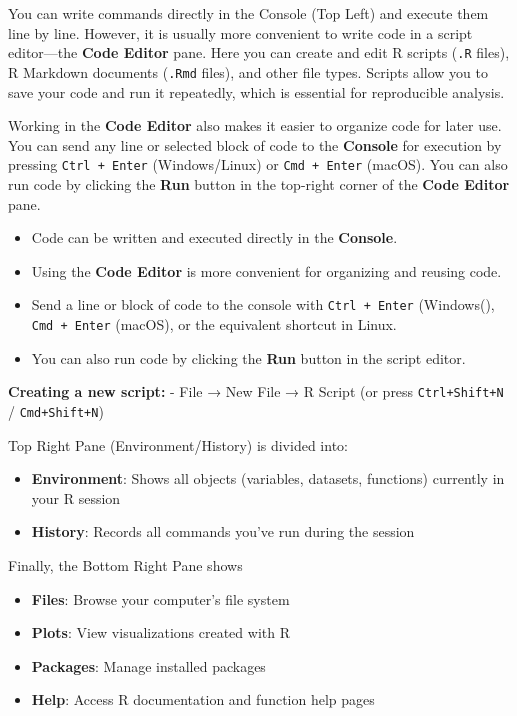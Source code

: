 \documentclass[
  10pt,
  b5paper,
  oneside]{book}
\providecommand{\tightlist}{%
  \setlength{\itemsep}{0pt}\setlength{\parskip}{0pt}}
\begin{document}
You can write commands directly in the Console (Top Left) and execute them line by line. However, it is usually more convenient to write code in a script editor---the \textbf{Code Editor} pane. Here you can create and edit R scripts (\texttt{.R} files), R Markdown documents (\texttt{.Rmd} files), and other file types. Scripts allow you to save your code and run it repeatedly, which is essential for reproducible analysis.

Working in the \textbf{Code Editor} also makes it easier to organize code for later use. You can send any line or selected block of code to the \textbf{Console} for execution by pressing \texttt{Ctrl\ +\ Enter} (Windows/Linux) or \texttt{Cmd\ +\ Enter} (macOS). You can also run code by clicking the \textbf{Run} button in the top-right corner of the \textbf{Code Editor} pane.

\begin{itemize}
\tightlist
\item
  Code can be written and executed directly in the \textbf{Console}.\\
\item
  Using the \textbf{Code Editor} is more convenient for organizing and reusing code.\\
\item
  Send a line or block of code to the console with \texttt{Ctrl\ +\ Enter} (Windows(), \texttt{Cmd\ +\ Enter} (macOS), or the equivalent shortcut in Linux.\\
\item
  You can also run code by clicking the \textbf{Run} button in the script editor.\\
\end{itemize}

\textbf{Creating a new script:}
- File → New File → R Script (or press \texttt{Ctrl+Shift+N} / \texttt{Cmd+Shift+N})

Top Right Pane (Environment/History) is divided into:

\begin{itemize}
\item
  \textbf{Environment}: Shows all objects (variables, datasets, functions) currently in your R session
\item
  \textbf{History}: Records all commands you've run during the session
\end{itemize}

Finally, the Bottom Right Pane shows

\begin{itemize}
\item
  \textbf{Files}: Browse your computer's file system
\item
  \textbf{Plots}: View visualizations created with R
\item
  \textbf{Packages}: Manage installed packages
\item
  \textbf{Help}: Access R documentation and function help pages
\end{itemize}
\end{document}
